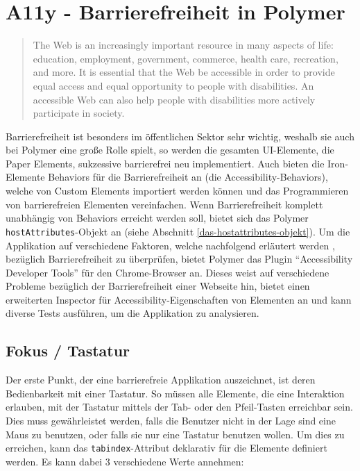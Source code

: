 \section{A11y - Barrierefreiheit in Polymer}\label{a11y---barrierefreiheit-in-polymer}

\begin{quote}
The Web is an increasingly important resource in many aspects of life: education, employment, government, commerce, health care, recreation, and more. It is essential that the Web be accessible in order to provide equal access and equal opportunity to people with disabilities. An accessible Web can also help people with disabilities more actively participate in society. \cite{citeulike:13915280}
\end{quote}

Barrierefreiheit ist besonders im öffentlichen Sektor sehr wichtig, weshalb sie auch bei Polymer eine große Rolle spielt, so werden die gesamten \ac{UI}-Elemente, die Paper Elements, sukzessive barrierefrei neu implementiert. Auch bieten die Iron-Elemente Behaviors für die Barrierefreiheit an (die Accessibility-Behaviors), welche von Custom Elements importiert werden können und das Programmieren von barrierefreien Elementen vereinfachen. Wenn Barrierefreiheit komplett unabhängig von Behaviors erreicht werden soll, bietet sich das Polymer \texttt{hostAttributes}-Objekt an (siehe Abschnitt \ref{das-hostattributes-objekt}). Um die Applikation auf verschiedene Faktoren, welche nachfolgend erläutert werden \cite{citeulike:13915273}, bezüglich Barrierefreiheit zu überprüfen, bietet Polymer das Plugin ``Accessibility Developer Tools'' für den Chrome-Browser an. Dieses weist auf verschiedene Probleme bezüglich der Barrierefreiheit einer Webseite hin, bietet einen erweiterten Inspector für Accessibility-Eigenschaften von Elementen an und kann diverse Tests ausführen, um die Applikation zu analysieren.


\subsection{Fokus / Tastatur}\label{fokus-tastatur}

Der erste Punkt, der eine barrierefreie Applikation auszeichnet, ist deren Bedienbarkeit mit einer Tastatur. So müssen alle Elemente, die eine Interaktion erlauben, mit der Tastatur mittels der Tab- oder den Pfeil-Tasten erreichbar sein. Dies muss gewährleistet werden, falls die Benutzer nicht in der Lage sind eine Maus zu benutzen, oder falls sie nur eine Tastatur benutzen wollen. Um dies zu erreichen, kann das \texttt{tabindex}-Attribut deklarativ für die Elemente definiert werden. Es kann dabei 3 verschiedene Werte annehmen:

